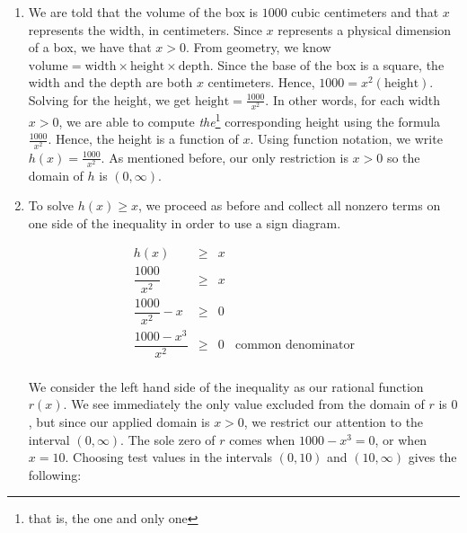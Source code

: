 \documentclass{ximera}
\begin{document}
\begin{example}
\begin{enumerate}
\item  We are told that the volume of the box is $1000$ cubic centimeters and that $x$ represents the width, in centimeters.  Since $x$ represents a physical dimension of a box, we have that $x>0$.  From geometry, we know $\text{volume} = \text{width} \times \text{height} \times \text{depth}$.  Since the base of the box is a square, the width and the depth are both $x$ centimeters.  Hence,  $1000 = x^2 (\text{height})$. Solving for the height, we get $\text{height} = \frac{1000}{x^2}$.   In other words, for each width $x>0$, we are able to compute \textit{the}\footnote{that is, the one and only one} corresponding height using the formula $\frac{1000}{x^2}$.  Hence, the height is a function of $x$.    Using function notation, we write $h(x) = \frac{1000}{x^2}$.  As mentioned before, our only restriction is $x>0$ so the domain of $h$ is $(0, \infty)$.

\begin{center}
\end{center}

\item  To solve $h(x) \geq x$, we proceed as before and collect all nonzero terms on one side of the inequality in order to use a sign diagram.

\[ \begin{array}{rclr}

h(x) & \geq & x & \\ [10pt]

\dfrac{1000}{x^2} & \geq & x & \\ [10pt]

\dfrac{1000}{x^2} - x & \geq & 0 \\ [10pt]

\dfrac{1000-x^3}{x^2} & \geq & 0 & \text{common denominator} \\[10pt]

\end{array} \]

We consider the left hand side of the inequality as our rational function $r(x)$.  We see immediately the only value excluded from the domain of $r$ is $0$, but since our applied domain is $x>0$, we restrict our attention to the interval  $(0, \infty)$.  The sole zero of $r$ comes when $1000-x^3 = 0$,  or when $x=10$.  Choosing test values in the intervals $(0,10)$ and $(10, \infty)$ gives the following:

\begin{center}


\end{center}
\end{enumerate}
\end{example}
\end{document}
